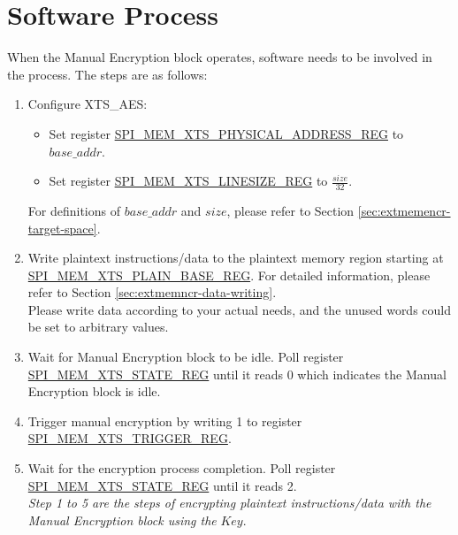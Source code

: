 \documentclass[main\_\_EN.tex]{subfiles}
\begin{document}
\section{ Software Process }

When the Manual Encryption block operates, software needs to be involved in the process. The steps are as follows:

\begin{enumerate}

    \item Configure XTS\_AES:
    \begin{itemize}
        \item Set register \hyperref[regdesc:SPIMEMXTSPHYSICALADDRESSREG]{SPI\_MEM\_XTS\_PHYSICAL\_ADDRESS\_REG} to \begin{math}base\_addr\end{math}.
        \item Set register \hyperref[regdesc:SPIMEMXTSLINESIZEREG]{SPI\_MEM\_XTS\_LINESIZE\_REG} to \begin{math}\frac{size}{32}\end{math}.
    \end{itemize}
    For definitions of \begin{math} base\_addr\end{math} and \begin{math}size\end{math}, please refer to Section \ref{sec:extmemencr-target-space}.

    \item Write plaintext instructions/data to the plaintext memory region starting at \hyperref[regdesc:SPIMEMXTSPLAINBASEREG]{SPI\_MEM\_XTS\_PLAIN\_BASE\_REG}. For detailed information, please refer to Section \ref{sec:extmemncr-data-writing}. \\Please write data according to your actual needs, and the unused words could be set to arbitrary values.

    \item Wait for Manual Encryption block to be idle. Poll register \hyperref[regdesc:SPIMEMXTSSTATEREG]{SPI\_MEM\_XTS\_STATE\_REG} until it reads 0 which indicates the Manual Encryption block is idle.

    \item Trigger manual encryption by writing 1 to register \hyperref[regdesc:SPIMEMXTSTRIGGERREG]{SPI\_MEM\_XTS\_TRIGGER\_REG}.

    \item Wait for the encryption process completion. Poll register \hyperref[regdesc:SPIMEMXTSSTATEREG]{SPI\_MEM\_XTS\_STATE\_REG} until it reads 2. \\ \textit{Step 1 to 5 are the steps of encrypting plaintext instructions/data with the Manual Encryption block using the} \begin{math}\mathit{Key}\end{math}.


\end{enumerate}
\end{document}
